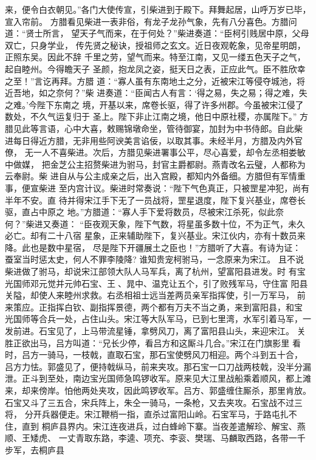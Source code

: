 来，便令白衣朝见。”各门大使传宣，引柴进到于殿下。拜舞起居，山呼万岁已毕，
宣入帘前。
方腊看见柴进一表非俗，有龙子龙孙气象，先有八分喜色。方腊问道：“贤士所言，
望天子气而来，在于何处？”柴进奏道：“臣柯引贱居中原，父母双亡，只身学业，
传先贤之秘诀，授祖师之玄文。近日夜观乾象，见帝星明朗，正照东吴。因此不辞
千里之劳，望气而来。特至江南，又见一缕五色天子之气，起自睦州。今得瞻天子
圣颜，抱龙凤之姿，挺天日之表，正应此气。臣不胜欣幸之至！”言讫再拜。方腊
道：“寡人虽有东南地土之分，近被宋江等侵夺城池，将近吾地，如之奈何？”柴
进奏道：“臣闻古人有言：‘得之易，失之易；得之难，失之难。’今陛下东南之
境，开基以来，席卷长驱，得了许多州郡。今虽被宋江侵了数处，不久气运复归于
圣上。陛下非止江南之境，他日中原社稷，亦属陛下。”
方腊见此等言语，心中大喜，敕赐锦墩命坐，管待御宴，加封为中书侍郎。自此柴
进每日得近方腊，无非用些阿谀美言谄佞，以取其事。未经半月，方腊及内外官僚，
无一人不喜柴进。次后，方腊见柴进署事公平，尽心喜爱，却令左丞相娄敏中做媒，
把金芝公主招赘柴进为驸马，封官主爵都尉。燕青改名云璧，人都称为云奉尉。柴
进自从与公主成亲之后，出入宫殿，都知内外备细。方腊但有军情重事，便宣柴进
至内宫计议。柴进时常奏说：“陛下气色真正，只被罡星冲犯，尚有半年不安。直
待并得宋江手下无了一员战将，罡星退度，陛下复兴基业，席卷长驱，直占中原之
地。”方腊道：“寡人手下爱将数员，尽被宋江杀死，似此奈何？”柴进又奏道：
“臣夜观天象，陛下气数，将星虽多数十位，不为正气，未久必亡。却有二十八宿
星象，正来辅助陛下，复兴基业。宋江伙内，亦有十数员来降。此也是数中星宿，
尽是陛下开疆展土之臣也！”方腊听了大喜。有诗为证：
蚕室当时惩太史，何人不罪李陵降?
谁知贵宠柯驸马，一念原来为宋江。
且不说柴进做了驸马，却说宋江部领大队人马军兵，离了杭州，望富阳县进发。时
有宝光国师邓元觉并元帅石宝、王、晁中、温克让五个，引了败残军马，守住富
阳县关隘，却使人来睦州求救。右丞相祖士远当差两员亲军指挥使，引一万军马，
前来策应。正指挥白钦、副指挥景德，两个都有万夫不当之勇，来到富阳县，和宝
光国师等合兵一处，占住山头。宋江等大队军马，已到七里湾，水军引着马军，一
发前进。石宝见了，上马带流星锤，拿劈风刀，离了富阳县山头，来迎宋江。
关胜正欲出马，吕方叫道：“兄长少停，看吕方和这厮斗几合。”宋江在门旗影里
看时，吕方一骑马，一枝戟，直取石宝，那石宝使劈风刀相迎。两个斗到五十合，
吕方力怯。郭盛见了，便持戟纵马，前来夹攻。那石宝一口刀战两枝戟，没半分漏
泄。正斗到至处，南边宝光国师急鸣锣收军。原来见大江里战船乘着顺风，都上滩
来，却来傍岸。怕他两处夹攻，因此鸣锣收军。吕方、郭盛缠住厮杀，那里肯放。
石宝又斗了三五合，宋兵阵上，朱仝一骑马，一条枪，又去夹攻。石宝战不过三将，
分开兵器便走。宋江鞭梢一指，直杀过富阳山岭。石宝军马，于路屯扎不住，直到
桐庐县界内。宋江连夜进兵，过白蜂岭下寨。当夜差遣解珍、解宝、燕顺、王矮虎、
一丈青取东路，李逵、项充、李衮、樊瑞、马麟取西路，各带一千步军，去桐庐县
